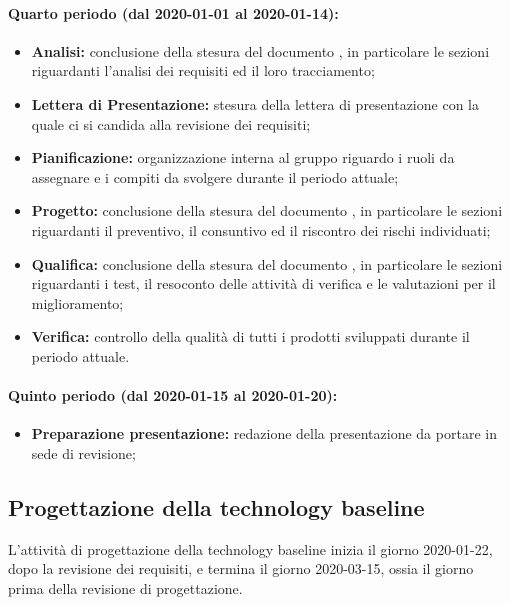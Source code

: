 			\paragraph{Quarto periodo (dal 2020-01-01 al 2020-01-14):}
			
				\begin{itemize}
					\item \textbf{Analisi:} conclusione della stesura del documento , in particolare le sezioni riguardanti l'analisi dei requisiti ed il loro tracciamento;
					\item \textbf{Lettera di Presentazione:} stesura della lettera di presentazione con la quale ci si candida alla revisione dei requisiti;
					\item \textbf{Pianificazione:} organizzazione interna al gruppo riguardo i ruoli da assegnare e i compiti da svolgere durante il periodo attuale;
					\item \textbf{Progetto:} conclusione della stesura del documento , in particolare le sezioni riguardanti il preventivo, il consuntivo ed il riscontro dei rischi individuati;
					\item \textbf{Qualifica:} conclusione della stesura del documento , in particolare le sezioni riguardanti i test, il resoconto delle attività di verifica e le valutazioni per il miglioramento;
					\item \textbf{Verifica:} controllo della qualità di tutti i prodotti sviluppati durante il periodo attuale.
				\end{itemize}
			
			\paragraph{Quinto periodo (dal 2020-01-15 al 2020-01-20):}
			
				\begin{itemize}
					\item \textbf{Preparazione presentazione:} redazione della presentazione da portare in sede di revisione;
				\end{itemize}

		\subsection{Progettazione della technology baseline}
	
			L'attività di progettazione della technology baseline inizia il giorno 2020-01-22, dopo la revisione dei requisiti, e termina il giorno 2020-03-15, ossia il giorno prima della revisione di progettazione.
			
